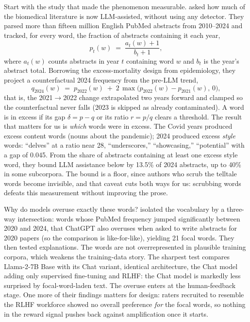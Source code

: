 Start with the study that made the phenomenon measurable.
\citet{kobak2025delving} asked how much of the biomedical literature is now
LLM-assisted, without using any detector. They parsed more than fifteen
million English PubMed abstracts from 2010--2024 and tracked, for every word,
the fraction of abstracts containing it each year,
\begin{equation}
p_{t}(w) \;=\; \frac{a_{t}(w)+1}{b_{t}+1},
\label{eq:kobak-p}
\end{equation}
where $a_t(w)$ counts abstracts in year $t$ containing word $w$ and $b_t$ is
the year's abstract total. Borrowing the excess-mortality design from
epidemiology, they project a counterfactual 2024 frequency from the pre-LLM
trend,
\begin{equation}
q_{2024}(w) \;=\; p_{2022}(w) \;+\; 2\,\max\bigl(p_{2022}(w)-p_{2021}(w),\,0\bigr),
\label{eq:kobak-q}
\end{equation}
that is, the 2021$\to$2022 change extrapolated two years forward and clamped
so the counterfactual never falls (2023 is skipped as already contaminated).
A word is in excess if its gap $\delta = p - q$ or its ratio $r = p/q$
clears a threshold. The result that matters for us is \emph{which} words
were in excess. The Covid years produced excess content words (nouns about
the pandemic); 2024 produced excess \emph{style} words: ``delves'' at a
ratio near 28, ``underscores,'' ``showcasing,'' ``potential'' with a gap of
0.045. From the share of abstracts containing at least one excess style
word, they bound LLM assistance below by 13.5\% of 2024 abstracts, up to
40\% in some subcorpora. The bound is a floor, since authors who scrub the
telltale words become invisible, and that caveat cuts both ways for us:
scrubbing words defeats this measurement without improving the prose.

Why do models overuse exactly these words? \citet{juzek2025delve} isolated
the vocabulary by a three-way intersection: words whose PubMed frequency
jumped significantly between 2020 and 2024, that ChatGPT also overuses when
asked to write abstracts for 2020 papers (so the comparison is
like-for-like), yielding 21 focal words. They then tested explanations. The
words are not overrepresented in plausible training corpora, which weakens
the training-data story. The sharpest test compares Llama-2-7B Base with its
Chat variant, identical architecture, the Chat model adding only supervised
fine-tuning and RLHF: the Chat model is markedly less surprised by
focal-word-laden text. The overuse enters at the human-feedback stage. One
more of their findings matters for design: raters recruited to resemble the
RLHF workforce showed no overall preference \emph{for} the focal words, so
nothing in the reward signal pushes back against amplification once it
starts.

